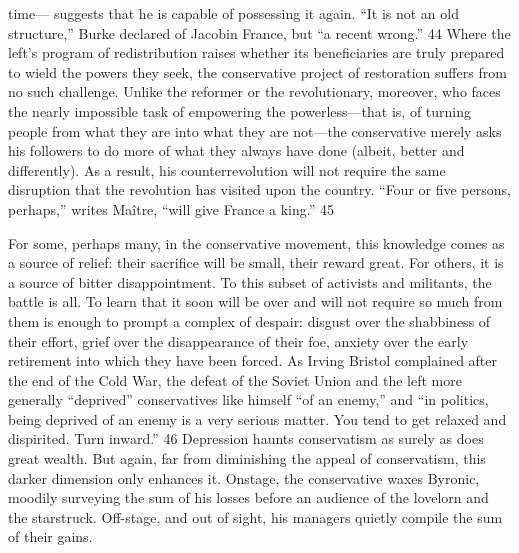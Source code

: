 time— suggests that he is capable of possessing it again. “It is not an old structure,” Burke declared of Jacobin France, but “a recent wrong.” {\color{blue} 44 } Where the left’s program of redistribution raises whether its beneficiaries are truly prepared to wield the powers they seek, the conservative project of restoration suffers from no such challenge. Unlike the reformer or the revolutionary, moreover, who faces the nearly impossible task of empowering the powerless—that is, of turning people from what they are into what they are not—the conservative merely asks his followers to do more of what they always have done (albeit, better and differently). As a result, his counterrevolution will not require the same disruption that the revolution has visited upon the country. “Four or five persons, perhaps,” writes Maître, “will give France a king.” {\color{blue} 45 } {\par} For some, perhaps many, in the conservative movement, this knowledge comes as a source of relief: their sacrifice will be small, their reward great. For others, it is a source of bitter disappointment. To this subset of activists and militants, the battle is all. To learn that it soon will be over and will not require so much from them is enough to prompt a complex of despair: disgust over the shabbiness of their effort, grief over the disappearance of their foe, anxiety over the early retirement into which they have been forced. As Irving Bristol complained after the end of the Cold War, the defeat of the Soviet Union and the left more generally “deprived” conservatives like himself “of an enemy,” and “in politics, being deprived of an enemy is a very serious matter. You tend to get relaxed and dispirited. Turn inward.” {\color{blue} 46 } Depression haunts conservatism as surely as does great wealth. But again, far from diminishing the appeal of conservatism, this darker dimension only enhances it. Onstage, the conservative waxes Byronic, moodily surveying the sum of his losses before an audience of the lovelorn and the starstruck. Off-stage, and out of sight, his managers quietly compile the sum of their gains.{\par}